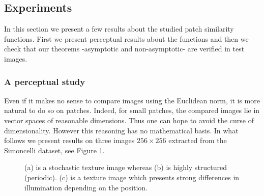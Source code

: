 \subsection{Experiments}
In this section we present a few results about the studied patch similarity functions. First we present perceptual results about the functions and then we check that our theorems -asymptotic and non-asymptotic- are verified in test images.
\subsubsection{A perceptual study}
Even if it makes no sense to compare images using the Euclidean norm, it is more natural to do so on patches. Indeed, for small patches, the compared images lie in vector spaces of reasonable dimensions. Thus one can hope to avoid the curse of dimensionality. However this reasoning has no mathematical basis. In what follows we present results on three images $256\times 256$ extracted from the Simoncelli dataset, see Figure \ref{fig:textures}.
\begin{figure}[h]
  \centering
   \hfill
   \hfill
   \hfill
  \caption{(a) is a stochastic texture image whereas (b) is highly structured (periodic). (c) is a texture image which presents strong differences in illumination depending on the position.}
  \label{fig:textures}
\end{figure}
\captionsetup[subfigure]{labelformat=empty}
